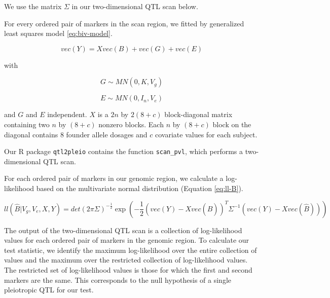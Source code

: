 \documentclass[oneside]{book}
\begin{document}
We use the matrix $\Sigma$ in our two-dimensional QTL scan below.




For every ordered pair of markers in the scan region, we fitted by generalized least squares model \ref{eq:biv-model}.

\begin{equation}
vec(Y) = X vec(B) + vec(G) + vec(E)
\label{eq:biv-model}
\end{equation}

with 

\begin{equation}
G \sim MN(0, K, V_g)
\end{equation}

\begin{equation}
E \sim MN(0, I_n, V_e)
\end{equation}

and $G$ and $E$ independent. $X$ is a $2n$ by $2(8 + c)$ block-diagonal matrix containing two $n$ by $(8 + c)$ nonzero blocks. Each $n$ by $(8 + c)$ block on the diagonal contains $8$ founder allele dosages and $c$ covariate values for each subject.  

Our R package \texttt{qtl2pleio} contains the function \texttt{scan\_pvl}, which performs a two-dimensional QTL scan. 

For each ordered pair of markers in our genomic region, we calculate a log-likelihood based on the multivariate normal distribution (Equation \ref{eq:ll-B}).

\begin{equation}
ll(\hat B | V_g, V_e, X, Y) = det\left(2\pi\Sigma\right)^{-\frac{1}{2}}\exp{\left(- \frac{1}{2}(vec(Y) - Xvec(\hat B))^T\Sigma^{-1}(vec(Y) - Xvec(\hat B))\right)}
\label{eq:ll-B}
\end{equation}




The output of the two-dimensional QTL scan is a collection of log-likelihood values for each ordered pair of markers in the genomic region. To calculate our test statistic, we identify the maximum log-likelihood over the entire collection of values and the maximum over the restricted collection of log-likelihood values. The restricted set of log-likelihood values is those for which the first and second markers are the same. This corresponds to the null hypothesis of a single pleiotropic QTL for our test.
\end{document}
